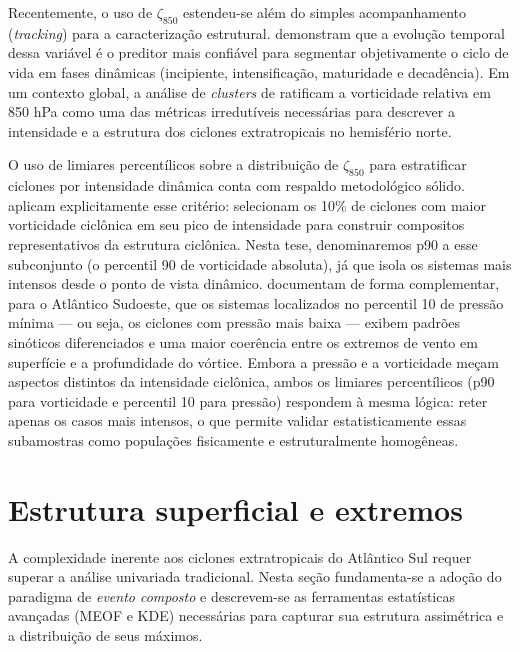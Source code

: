 Recentemente, o uso de $\zeta_{850}$ estendeu-se além do simples acompanhamento (\textit{tracking}) para a caracterização estrutural. \citet{coutodesouza2024new} demonstram que a evolução temporal dessa variável é o preditor mais confiável para segmentar objetivamente o ciclo de vida em fases dinâmicas (incipiente, intensificação, maturidade e decadência). Em um contexto global, a análise de \textit{clusters} de \citet{corner2025classification} ratificam a vorticidade relativa em 850 hPa como uma das métricas irredutíveis necessárias para descrever a intensidade e a estrutura dos ciclones extratropicais no hemisfério norte.

O uso de limiares percentílicos sobre a distribuição de $\zeta_{850}$ para estratificar ciclones por intensidade dinâmica conta com respaldo metodológico sólido. \citet{priestley2022improved} aplicam explicitamente esse critério: selecionam os 10\% de ciclones com maior vorticidade ciclônica em seu pico de intensidade para construir compositos representativos da estrutura ciclônica. Nesta tese, denominaremos p90 a esse subconjunto (o percentil 90 de vorticidade absoluta), já que isola os sistemas mais intensos desde o ponto de vista dinâmico. \citet{andrade2024composite} documentam de forma complementar, para o Atlântico Sudoeste, que os sistemas localizados no percentil 10 de pressão mínima — ou seja, os ciclones com pressão mais baixa — exibem padrões sinóticos diferenciados e uma maior coerência entre os extremos de vento em superfície e a profundidade do vórtice. Embora a pressão e a vorticidade meçam aspectos distintos da intensidade ciclônica, ambos os limiares percentílicos (p90 para vorticidade e percentil 10 para pressão) respondem à mesma lógica: reter apenas os casos mais intensos, o que permite validar estatisticamente essas subamostras como populações fisicamente e estruturalmente homogêneas.


\section{Estrutura superficial e extremos}\label{sec:tb_compuestos}

A complexidade inerente aos ciclones extratropicais do Atlântico Sul requer superar a análise univariada tradicional. Nesta seção fundamenta-se a adoção do paradigma de \textit{evento composto} e descrevem-se as ferramentas estatísticas avançadas (MEOF e KDE) necessárias para capturar sua estrutura assimétrica e a distribuição de seus máximos.

